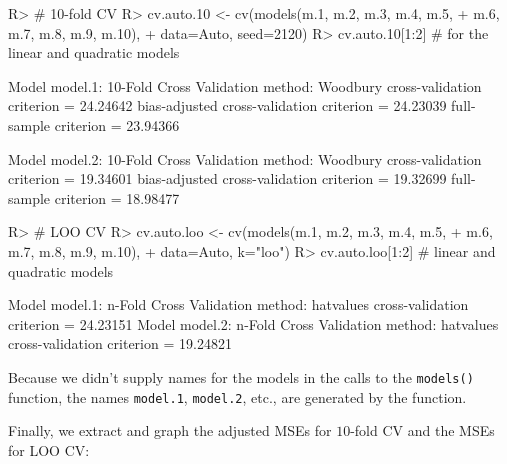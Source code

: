 \documentclass[
]{jss}
\begin{document}
\begin{CodeChunk}
\begin{CodeInput}
R> # 10-fold CV
R> cv.auto.10 <- cv(models(m.1, m.2, m.3, m.4, m.5,
+                      m.6, m.7, m.8, m.9, m.10),
+               data=Auto, seed=2120)
R> cv.auto.10[1:2] # for the linear and quadratic models
\end{CodeInput}
\begin{CodeOutput}

Model model.1:
10-Fold Cross Validation
method: Woodbury
cross-validation criterion = 24.24642
bias-adjusted cross-validation criterion = 24.23039
full-sample criterion = 23.94366 

Model model.2:
10-Fold Cross Validation
method: Woodbury
cross-validation criterion = 19.34601
bias-adjusted cross-validation criterion = 19.32699
full-sample criterion = 18.98477 
\end{CodeOutput}
\begin{CodeInput}
R> # LOO CV
R> cv.auto.loo <- cv(models(m.1, m.2, m.3, m.4, m.5,
+                         m.6, m.7, m.8, m.9, m.10),
+                  data=Auto, k="loo")
R> cv.auto.loo[1:2] # linear and quadratic models
\end{CodeInput}
\begin{CodeOutput}

Model model.1:
n-Fold Cross Validation
method: hatvalues
cross-validation criterion = 24.23151
Model model.2:
n-Fold Cross Validation
method: hatvalues
cross-validation criterion = 19.24821
\end{CodeOutput}
\end{CodeChunk}

Because we didn't supply names for the models in the calls to the
\texttt{models()} function, the names \texttt{model.1},
\texttt{model.2}, etc., are generated by the function.

Finally, we extract and graph the adjusted MSEs for \(10\)-fold CV and
the MSEs for LOO CV:
\end{document}
